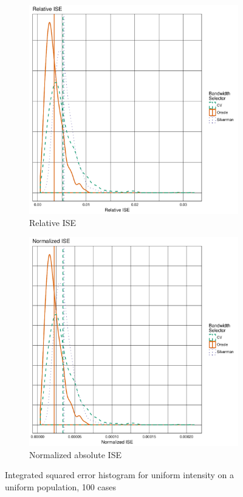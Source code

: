 \begin{figure}[htbp]
    \centering
    \begin{subfigure}[b]{0.45\textwidth}
    \includegraphics[width=\textwidth]{output/ise-relative-histogram}
    \caption{Relative ISE}
    \end{subfigure}
    \begin{subfigure}[b]{0.45\textwidth}
    \includegraphics[width=\textwidth]{output/ise-normalized-histogram}
    \caption{Normalized absolute ISE}
    \end{subfigure}
    \caption[ISE: uniform on uniform]{Integrated squared error histogram for uniform intensity on a uniform population, 100 cases}
    \label{fig:ise:template}
\end{figure}

